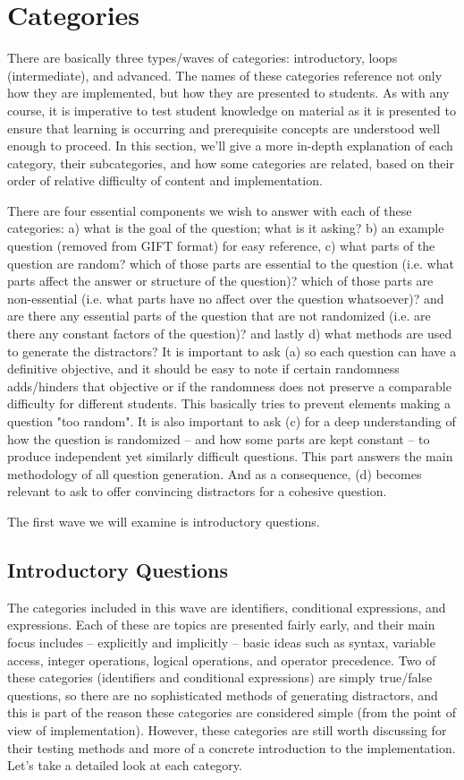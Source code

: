 \documentclass{article}
\begin{document}
\section{Categories}

There are basically three types/waves of categories: introductory, loops (intermediate), and advanced. The names of these categories reference not only how
they are implemented, but how they are presented to students. As with any course, it is imperative to test student knowledge on material as it is presented
to ensure that learning is occurring and prerequisite concepts are understood well enough to proceed. In this section, we'll give a more in-depth explanation
of each category, their subcategories, and how some categories are related, based on their order of relative difficulty of content and implementation.

There are four essential components we wish to answer with each of these categories: a) what is the goal of the question; what is it asking? b) an example question
(removed from GIFT format) for easy reference, c) what parts of the question are random? which of those parts are essential to the question (i.e. what
parts affect the answer or structure of the question)? which of those parts are non-essential (i.e. what parts have no affect over the question whatsoever)?
and are there any essential parts of the question that are not randomized (i.e. are there any constant factors of the question)? and lastly d) what methods
are used to generate the distractors? It is important to ask (a) so each question can have a definitive objective, and it should be easy to note if
certain randomness adds/hinders that objective or if the randomness does not preserve a comparable difficulty for different students.
This basically tries to prevent elements making a question "too random". It is also important to ask (c) for a deep understanding of how the question
is randomized -- and how some parts are kept constant -- to produce independent yet similarly difficult questions. This part answers the main
methodology of all question generation. And as a consequence, (d) becomes relevant to ask to offer convincing distractors for a cohesive question.

The first wave we will examine is introductory questions.

\subsection{Introductory Questions}
The categories included in this wave are identifiers, conditional expressions, and expressions. Each of these are topics are presented fairly early, and their main
focus includes -- explicitly and implicitly -- basic ideas such as syntax, variable access, integer operations, logical operations, and operator precedence.
Two of these categories (identifiers and conditional expressions) are simply true/false questions, so there are no sophisticated methods of generating
distractors, and this is part of the reason these categories are considered simple (from the point of view of implementation). However, these categories are still
worth discussing for their testing methods and more of a concrete introduction to the implementation. Let's take a detailed look at each category.
\end{document}
